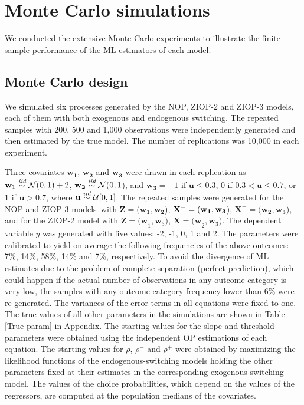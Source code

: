 \documentclass[letterpaper,fleqn,12pt]{article}
\begin{document}
\section{Monte Carlo simulations}

We conducted the extensive Monte Carlo experiments to illustrate the finite
sample performance of the ML estimators of each model.

\subsection{Monte Carlo design}

We simulated six processes generated by the NOP, ZIOP-2 and ZIOP-3 models,
each of them with both exogenous and endogenous switching. The repeated
samples with 200, 500 and 1,000 observations were independently generated
and then estimated by the true model. The number of replications was 10,000
in each experiment.

Three covariates $\mathbf{w}_{\mathbf{1}}$, $\mathbf{w}_{\mathbf{2}}$ and $%
\mathbf{w}_{\mathbf{3}}$ were drawn in each replication as\noindent\ $%
\mathbf{w}_{\mathbf{1}}\overset{\emph{iid}}{\sim }\mathcal{N}(0,1)+2$, $%
\mathbf{w}_{\mathbf{2}}\overset{\emph{iid}}{\sim }\mathcal{N}(0,1$), and $%
\mathbf{w}_{\mathbf{3}}=-1$ if $\mathbf{u}\leq 0.3$, $0$ if $0.3<\mathbf{u}%
\leq 0.7$, or $1$ if $\mathbf{u}>0.7$, where $\mathbf{u}\overset{\emph{iid}}{%
\sim }\mathcal{U}[0,1]$. The repeated samples were generated for the NOP and
ZIOP-3 models\textit{\ }with $\mathbf{Z=(w_{1}},\mathbf{w_{2}}$), $\mathbf{%
\mathbf{X}^{-}=(w_{1}},\mathbf{w_{3}}$), $\mathbf{\mathbf{X}^{+}=(w_{2}},%
\mathbf{w_{3}}$), and for the ZIOP-2 model with $\mathbf{Z=(w}_{1},\mathbf{w}%
_{3})$, $\mathbf{\mathbf{X}=(w}_{2},\mathbf{w}_{3})$. The dependent variable 
$y$ was generated with five values: -2, -1, 0, 1 and 2. The parameters were
calibrated to yield on average the following frequencies of the above
outcomes: 7\%, 14\%, 58\%, 14\% and 7\%, respectively. To avoid the
divergence of ML estimates due to the problem of complete separation
(perfect prediction), which could happen if the actual number of
observations in any outcome category is very low, the samples with any
outcome category frequency lower than 6\% were re-generated. The variances
of the error terms in all equations were fixed to one. The true values of
all other parameters in the simulations are shown in Table \ref{True param}
in Appendix. The starting values for the slope and threshold parameters were
obtained using the independent OP estimations of each equation. The starting
values for $\rho $, $\rho ^{-}$ and $\rho ^{+}$ were obtained by maximizing
the likelihood functions of the endogenous-switching models holding the
other parameters fixed at their estimates in the corresponding
exogenous-switching model. The values of the choice probabilities, which
depend on the values of the regressors, are computed at the population
medians of the covariates.
\end{document}
